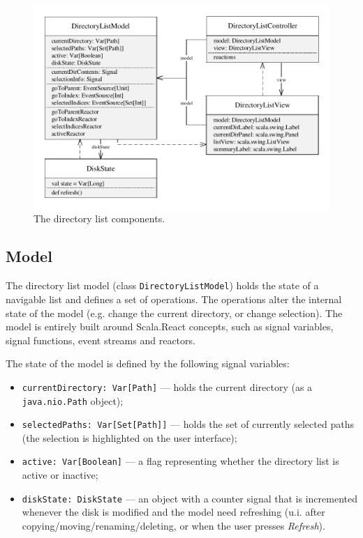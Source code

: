\begin{figure}[h!]
\centering
  \includegraphics[width=1\textwidth]{images/scomm-mvc-pattern.pdf}
\caption{The directory list components.}
\label{fig:scomm_mvc_pattern}
\end{figure}


\subsection{Model}

The directory list model (class \texttt{DirectoryListModel}) holds the state of a navigable list and defines a set of operations. The operations alter the internal state of the model (e.g. change the current directory, or change selection). The model is entirely built around Scala.React concepts, such as signal variables, signal functions, event streams and reactors.

The state of the model is defined by the following signal variables:
\begin{itemize}
\item \texttt{currentDirectory: Var[Path]} --- holds the current directory (as a \texttt{java.nio.Path} object);
\item \texttt{selectedPaths: Var[Set[Path]]} --- holds the set of currently selected paths (the selection is highlighted on the user interface);
\item \texttt{active: Var[Boolean]} --- a flag representing whether the directory list is active or inactive;
\item \texttt{diskState: DiskState} --- an object with a counter signal that is incremented whenever the disk is modified and the model need refreshing (u.i. after copying/moving/renaming/deleting, or when the user presses \emph{Refresh}).
\end{itemize}

